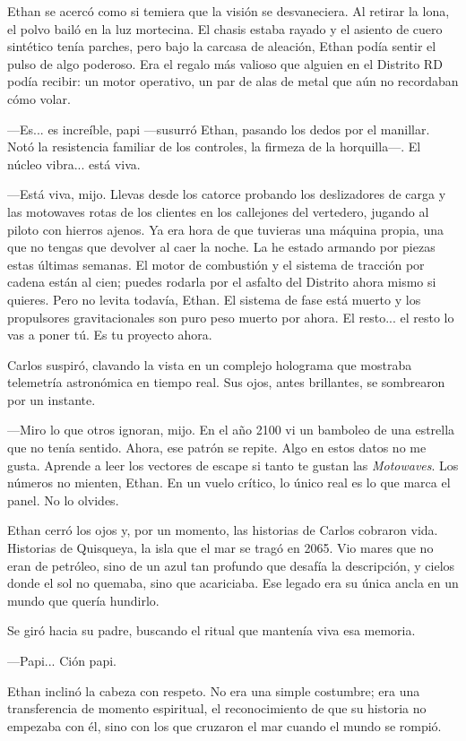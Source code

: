 \documentclass[11pt,twoside]{book}
\begin{document}
Ethan se acercó como si temiera que la visión se desvaneciera. Al retirar la lona, el polvo bailó en la luz mortecina. El chasis estaba rayado y el asiento de cuero sintético tenía parches, pero bajo la carcasa de aleación, Ethan podía sentir el pulso de algo poderoso. Era el regalo más valioso que alguien en el Distrito RD podía recibir: un motor operativo, un par de alas de metal que aún no recordaban cómo volar.

---Es... es increíble, papi ---susurró Ethan, pasando los dedos por el manillar. Notó la resistencia familiar de los controles, la firmeza de la horquilla---. El núcleo vibra... está viva.

---Está viva, mijo. Llevas desde los catorce probando los deslizadores de carga y las motowaves rotas de los clientes en los callejones del vertedero, jugando al piloto con hierros ajenos. Ya era hora de que tuvieras una máquina propia, una que no tengas que devolver al caer la noche. La he estado armando por piezas estas últimas semanas. El motor de combustión y el sistema de tracción por cadena están al cien; puedes rodarla por el asfalto del Distrito ahora mismo si quieres. Pero no levita todavía, Ethan. El sistema de fase está muerto y los propulsores gravitacionales son puro peso muerto por ahora. El resto... el resto lo vas a poner tú. Es tu proyecto ahora.

Carlos suspiró, clavando la vista en un complejo holograma que mostraba telemetría astronómica en tiempo real. Sus ojos, antes brillantes, se sombrearon por un instante.

---Miro lo que otros ignoran, mijo. En el año 2100 vi un bamboleo de una estrella que no tenía sentido. Ahora, ese patrón se repite. Algo en estos datos no me gusta. Aprende a leer los vectores de escape si tanto te gustan las \textit{Motowaves}. Los números no mienten, Ethan. En un vuelo crítico, lo único real es lo que marca el panel. No lo olvides.

Ethan cerró los ojos y, por un momento, las historias de Carlos cobraron vida. Historias de Quisqueya, la isla que el mar se tragó en 2065. Vio mares que no eran de petróleo, sino de un azul tan profundo que desafía la descripción, y cielos donde el sol no quemaba, sino que acariciaba. Ese legado era su única ancla en un mundo que quería hundirlo.

Se giró hacia su padre, buscando el ritual que mantenía viva esa memoria.

---Papi... Ción papi.

Ethan inclinó la cabeza con respeto. No era una simple costumbre; era una transferencia de momento espiritual, el reconocimiento de que su historia no empezaba con él, sino con los que cruzaron el mar cuando el mundo se rompió.
\end{document}
